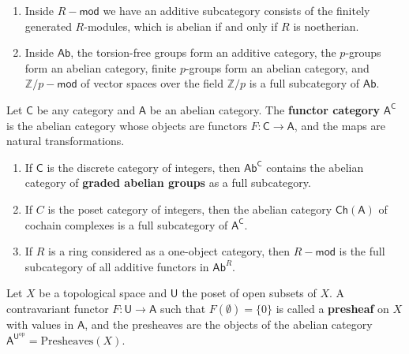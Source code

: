 \begin{exmp}
\begin{enumerate}
\item Inside $R-\mathsf{mod}$ we have an additive subcategory consists of the finitely generated $R$-modules, which is abelian if and only if $R$ is noetherian.
\item Inside $\mathsf{Ab}$, the torsion-free groups form an additive category, the $p$-groups form an abelian category, finite $p$-groups form an abelian category, and $\mathbb{Z}/p-\mathsf{mod}$ of vector spaces over the field $\mathbb{Z}/p$ is a full subcategory of $\mathsf{Ab}$.
\end{enumerate}
\end{exmp}

\begin{defn} Let $\mathsf{C}$ be any category and $\mathsf{A}$ be an abelian category. The \textbf{functor category} $\mathsf{A}^\mathsf{C}$ is the abelian category whose objects are functors $F:\mathsf{C}\rightarrow \mathsf{A}$, and the maps are natural transformations.
\end{defn}

\begin{exmp}
\begin{enumerate}
\item If $\mathsf{C}$ is the discrete category of integers, then $\mathsf{Ab}^\mathsf{C}$ contains the abelian category of \textbf{graded abelian groups} as a full subcategory.
\item If $C$ is the poset category of integers, then the abelian category $\mathsf{Ch}(\mathsf{A})$ of cochain complexes is a full subcategory of $\mathsf{A}^\mathsf{C}$.
\item If $R$ is a ring considered as a one-object category, then $R-\mathsf{mod}$ is the full subcategory of all additive functors in $\mathsf{Ab}^R$.
\end{enumerate}
\end{exmp}

\begin{defn} Let $X$ be a topological space and $\mathsf{U}$ the poset of open subsets of $X$. A contravariant functor $F:\mathsf{U}\rightarrow \mathsf{A}$ such that $F(\emptyset)=\{0\}$ is called a \textbf{presheaf} on $X$ with values in $\mathsf{A}$, and the presheaves are the objects of the abelian category $\mathsf{A}^{\mathsf{U}^{\textrm{op}}}=\textrm{Presheaves}(X)$.
\end{defn}

